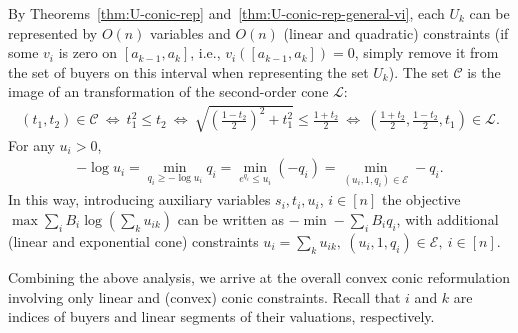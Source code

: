 By Theorems~\ref{thm:U-conic-rep} and~\ref{thm:U-conic-rep-general-vi}, each $U_k$ can be represented by $O(n)$ variables and $O(n)$ (linear and quadratic) constraints (if some $v_i$ is zero on $[a_{k-1}, a_k]$, i.e., $v_i([a_{k-1}, a_k]) = 0$, simply remove it from the set of buyers on this interval when representing the set $U_k$). 
The set $\mathcal{C}$ is the image of an transformation of the second-order cone $\mathcal{L}$:
\begin{align*}
	(t_1, t_2) \in \mathcal{C} \ \Leftrightarrow \ t_1^2 \leq t_2 \ \Leftrightarrow \ \sqrt{\left(\frac{1-t_2}{2}\right)^2 + t_1^2} \leq \frac{1+t_2}{2} \ \Leftrightarrow \ \left( \frac{1+t_2}{2}, \frac{1-t_2}{2}, t_1 \right) \in \mathcal{L}.
\end{align*}
For any $u_i>0$,
\begin{align}
	- \log u_i = \min_{q_i\geq -\log u_i} q_i = \min_{e^{q_i} \leq u_i} (-q_i) = \min_{ (u_i, 1, q_i) \in \mathcal{E}} -q_i. \label{eq:log(ui)=>min(-qi)}
\end{align}
In this way, introducing auxiliary variables $s_i, t_i, u_i$, $i\in [n]$ the objective $\max \sum_i B_i \log \left( \sum_k u_{ik} \right)$ can be written as $-\min - \sum_i B_i q_i$, with additional (linear and exponential cone) constraints $u_i = \sum_k u_{ik}, \ 
(u_i, 1, q_i)\in \mathcal{E},\ i\in [n]$.

Combining the above analysis, we arrive at the overall convex conic reformulation involving only linear and (convex) conic constraints.
Recall that $i$ and $k$ are indices of buyers and linear segments of their valuations, respectively.

